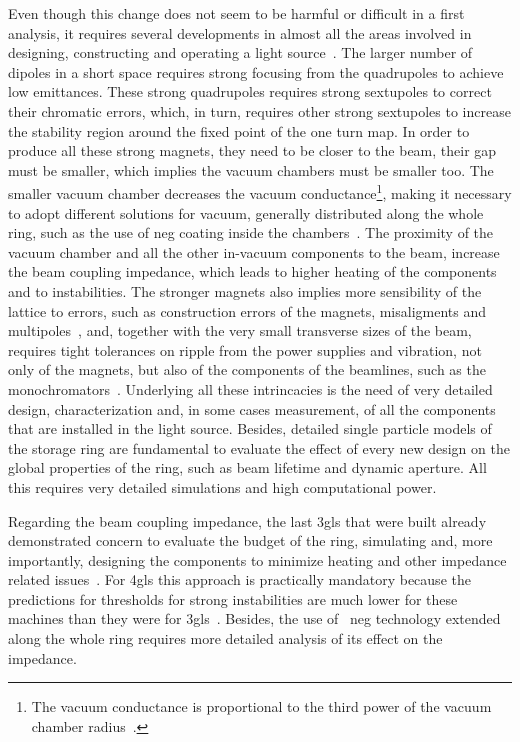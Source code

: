     Even though this change does not seem to be harmful or difficult in a first analysis, it requires several developments in almost all the areas involved in designing, constructing and operating a light source~\cite{Liu2017,Neuenschwander2015,Hettel2014}. The larger number of dipoles in a short space requires strong focusing from the quadrupoles to achieve low emittances. These strong quadrupoles requires strong sextupoles to correct their chromatic errors, which, in turn, requires other strong sextupoles to increase the stability region around the fixed point of the one turn map. In order to produce all these strong magnets, they need to be closer to the beam, their gap must be smaller, which implies the vacuum chambers must be smaller too. The smaller vacuum chamber decreases the vacuum conductance\footnote{The vacuum conductance is proportional to the third power of the vacuum chamber radius~\cite{someone}.}, making it necessary to adopt different solutions for vacuum, generally distributed along the whole ring, such as the use of \gls{neg} coating inside the chambers~\cite{negcitation}. The proximity of the vacuum chamber and all the other in-vacuum components to the beam, increase the beam coupling impedance, which leads to higher heating of the components and to instabilities. The stronger magnets also implies more sensibility of the lattice to errors, such as construction errors of the magnets, misaligments and multipoles~\cite{wikilnls}, and, together with the very small transverse sizes of the beam, requires tight tolerances on ripple from the power supplies and vibration, not only of the magnets, but also of the components of the beamlines, such as the monochromators~\cite{monochromlnls}. Underlying all these intrincacies is the need of very detailed design, characterization and, in some cases measurement, of all the components that are installed in the light source. Besides, detailed single particle models of the storage ring are fundamental to evaluate the effect of every new design on the global properties of the ring, such as beam lifetime and dynamic aperture. All this requires very detailed simulations and high computational power.

    Regarding the beam coupling impedance, the last \gls{3gls} that were built already demonstrated concern to evaluate the budget of the ring, simulating and, more importantly, designing the components to minimize heating and other impedance related issues~\cite{nagaokasoleil,tomasalba,nslsii}. For \gls{4gls} this approach is practically mandatory because the predictions for thresholds for strong instabilities are much lower for these machines than they were for \gls{3gls}~\cite{heps,sirius,diamond2}. Besides, the use of ~\gls{neg} technology extended along the whole ring requires more detailed analysis of its effect on the impedance.

